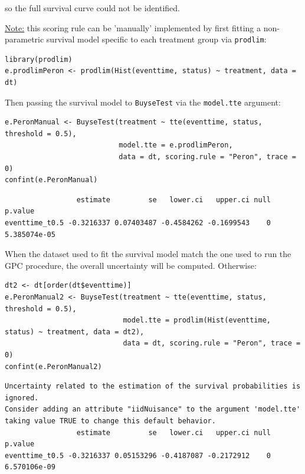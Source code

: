 \documentclass[12pt]{article}
\begin{document}
so the full survival curve could not be identified.

\bigskip

\noindent \uline{Note:} this scoring rule can be 'manually' implemented by
first fitting a non-parametric survival model specific to each
treatment group via \texttt{prodlim}:
\lstset{language=r,label= ,caption= ,captionpos=b,numbers=none}
\begin{lstlisting}
library(prodlim)
e.prodlimPeron <- prodlim(Hist(eventtime, status) ~ treatment, data = dt)
\end{lstlisting}

Then passing the survival model to \texttt{BuyseTest} via the \texttt{model.tte} argument:
\lstset{language=r,label= ,caption= ,captionpos=b,numbers=none}
\begin{lstlisting}
e.PeronManual <- BuyseTest(treatment ~ tte(eventtime, status, threshold = 0.5),
                           model.tte = e.prodlimPeron,
                           data = dt, scoring.rule = "Peron", trace = 0)
confint(e.PeronManual)
\end{lstlisting}

\begin{verbatim}
                 estimate         se   lower.ci   upper.ci null      p.value
eventtime_t0.5 -0.3216337 0.07403487 -0.4584262 -0.1699543    0 5.385074e-05
\end{verbatim}


When the dataset used to fit the survival model match the one used to
run the GPC procedure, the overall uncertainty will be
computed. Otherwise:
\lstset{language=r,label= ,caption= ,captionpos=b,numbers=none}
\begin{lstlisting}
dt2 <- dt[order(dt$eventtime)]
e.PeronManual2 <- BuyseTest(treatment ~ tte(eventtime, status, threshold = 0.5),
                            model.tte = prodlim(Hist(eventtime, status) ~ treatment, data = dt2),
                            data = dt, scoring.rule = "Peron", trace = 0)
confint(e.PeronManual2)
\end{lstlisting}

\begin{verbatim}
Uncertainty related to the estimation of the survival probabilities is ignored. 
Consider adding an attribute "iidNuisance" to the argument 'model.tte' taking value TRUE to change this default behavior.
                 estimate         se   lower.ci   upper.ci null      p.value
eventtime_t0.5 -0.3216337 0.05153296 -0.4187087 -0.2172912    0 6.570106e-09
\end{verbatim}
\end{document}
